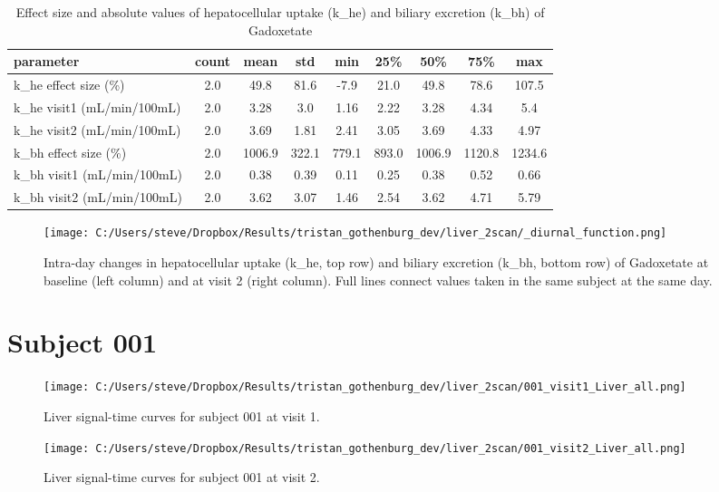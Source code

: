 \documentclass{epflreport}%
\begin{document}
%


\begin{table}[h!]%
\centering%
\begin{tabular}{lcccccccc}%
\hline%
parameter&count&mean&std&min&25\%&50\%&75\%&max\\%
\hline%
k\_he effect size (\%)&2.0&49.8&81.6&{-}7.9&21.0&49.8&78.6&107.5\\%
k\_he visit1 (mL/min/100mL)&2.0&3.28&3.0&1.16&2.22&3.28&4.34&5.4\\%
k\_he visit2 (mL/min/100mL)&2.0&3.69&1.81&2.41&3.05&3.69&4.33&4.97\\%
k\_bh effect size (\%)&2.0&1006.9&322.1&779.1&893.0&1006.9&1120.8&1234.6\\%
k\_bh visit1 (mL/min/100mL)&2.0&0.38&0.39&0.11&0.25&0.38&0.52&0.66\\%
k\_bh visit2 (mL/min/100mL)&2.0&3.62&3.07&1.46&2.54&3.62&4.71&5.79\\%
\hline%
\end{tabular}%
\caption{Effect size and absolute values of hepatocellular uptake (k\_he) and biliary excretion (k\_bh) of Gadoxetate}%
\end{table}

%


\begin{figure}[h!]%
\centering%
\texttt{[image: C:/Users/steve/Dropbox/Results/tristan\_gothenburg\_dev/liver\_2scan/\_diurnal\_function.png]}%
\caption{Intra{-}day changes in hepatocellular uptake (k\_he, top row) and biliary excretion (k\_bh, bottom row) of Gadoxetate at baseline (left column) and at visit 2 (right column). Full lines connect values taken in the same subject at the same day.}%
\end{figure}

%
\clearpage%
\section{Subject 001}%
\label{sec:Subject001}%


\begin{figure}[h!]%
\centering%
\texttt{[image: C:/Users/steve/Dropbox/Results/tristan\_gothenburg\_dev/liver\_2scan/001\_visit1\_Liver\_all.png]}%
\caption{Liver signal{-}time curves for subject 001 at visit 1.}%
\end{figure}

%


\begin{figure}[h!]%
\centering%
\texttt{[image: C:/Users/steve/Dropbox/Results/tristan\_gothenburg\_dev/liver\_2scan/001\_visit2\_Liver\_all.png]}%
\caption{Liver signal{-}time curves for subject 001 at visit 2.}%
\end{figure}
\end{document}
